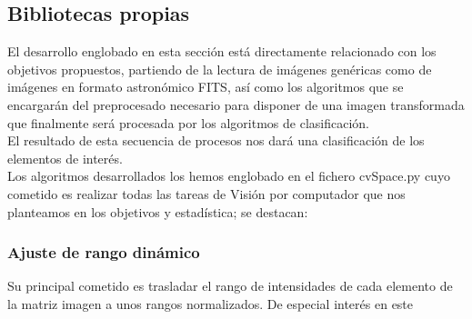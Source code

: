 	\subsection{Bibliotecas propias}\label{ownLib}
	El desarrollo englobado en esta sección está directamente relacionado con los objetivos propuestos, partiendo de la lectura de imágenes genéricas como de imágenes en formato astronómico FITS, así como los algoritmos que se encargarán del preprocesado necesario para disponer de una imagen transformada que finalmente será procesada por los algoritmos de clasificación.\\
	El resultado de esta secuencia de procesos nos dará una clasificación de los elementos de interés. \\
	Los algoritmos desarrollados los hemos englobado en el fichero cvSpace.py cuyo cometido es realizar todas las tareas de Visión por computador que nos planteamos en los objetivos y estadística; se destacan:
	\subsubsection{Ajuste de rango dinámico}
	Su principal cometido es trasladar el rango de intensidades de cada elemento de la matriz imagen a unos rangos normalizados. De especial interés en este \\
	

